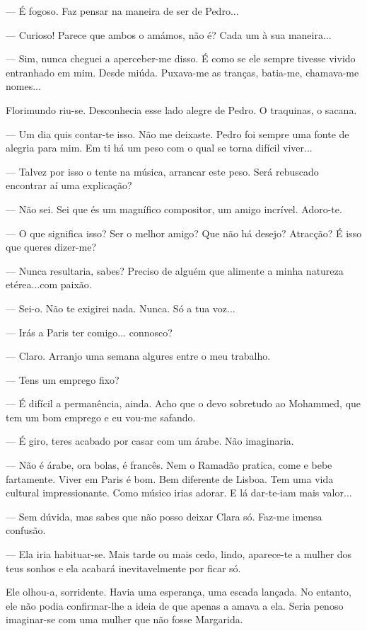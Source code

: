 --- É fogoso. Faz pensar na maneira de ser de Pedro...

--- Curioso! Parece que ambos o amámos, não é? Cada um à sua maneira...

--- Sim, nunca cheguei a aperceber-me disso. É como se ele sempre tivesse
vivido entranhado em mim. Desde miúda. Puxava-me as tranças, batia-me,
chamava-me nomes...

Florimundo riu-se. Desconhecia esse lado alegre de Pedro. O traquinas, o
sacana.

--- Um dia quis contar-te isso. Não me deixaste. Pedro foi sempre uma
fonte de alegria para mim. Em ti há um peso com o qual se torna difícil
viver...

--- Talvez por isso o tente na música, arrancar este peso. Será rebuscado
encontrar aí uma explicação?

--- Não sei. Sei que és um magnífico compositor, um amigo incrível.
Adoro-te.

--- O que significa isso? Ser o melhor amigo? Que não há desejo? Atracção?
É isso que queres dizer-me?

--- Nunca resultaria, sabes? Preciso de alguém que alimente a minha
natureza etérea...com paixão.

--- Sei-o. Não te exigirei nada. Nunca. Só a tua voz...

--- Irás a Paris ter comigo... connosco?

--- Claro. Arranjo uma semana algures entre o meu trabalho.

--- Tens um emprego fixo?

--- É difícil a permanência, ainda. Acho que o devo sobretudo ao Mohammed,
que tem um bom emprego e eu vou-me safando.

--- É giro, teres acabado por casar com um árabe. Não imaginaria.

--- Não é árabe, ora bolas, é francês. Nem o Ramadão pratica, come e bebe
fartamente. Viver em Paris é bom. Bem diferente de Lisboa. Tem uma vida
cultural impressionante. Como músico irias adorar. E lá dar-te-iam mais
valor...

--- Sem dúvida, mas sabes que não posso deixar Clara só. Faz-me imensa
confusão.

--- Ela iria habituar-se. Mais tarde ou mais cedo, lindo, aparece-te a
mulher dos teus sonhos e ela acabará inevitavelmente por ficar só.

Ele olhou-a, sorridente. Havia uma esperança, uma escada lançada. No
entanto, ele não podia confirmar-lhe a ideia de que apenas a amava a
ela. Seria penoso imaginar-se com uma mulher que não fosse Margarida.

